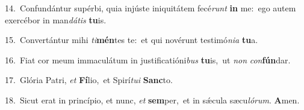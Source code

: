{\numbfont\textcolor{\numbcolor}{14.}}~Confundántur supérbi, quia injúste iniquitátem fecé\textit{runt} \textbf{in} me:~\star ego autem exercébor in man\-\textit{dá}\-\textit{tis} \textbf{tu}\-is.\par
{\numbfont\textcolor{\numbcolor}{15.}}~Convertántur mihi \textit{ti}\-\textbf{mén}tes te:~\star et qui novérunt testimó\-\textit{ni}\-\textit{a} \textbf{tu}\-a.\par
{\numbfont\textcolor{\numbcolor}{16.}}~Fiat cor meum immaculátum in justificatióni\textit{bus} \textbf{tu}\-is,~\star ut \textit{non} \textit{con}\-\textbf{fún}dar.\par
{\numbfont\textcolor{\numbcolor}{17.}}~Glória Patri, \textit{et} \textbf{Fí}\-lio,~\star et Spirí\-\textit{tu}\-\textit{i} \textbf{Sanc}\-to.\par
{\numbfont\textcolor{\numbcolor}{18.}}~Sicut erat in princípio, et nunc, \textit{et} \textbf{sem}\-per,~\star et in sǽcula sæcu\-\textit{ló}\-\textit{rum}. \textbf{A}\-men.\par
